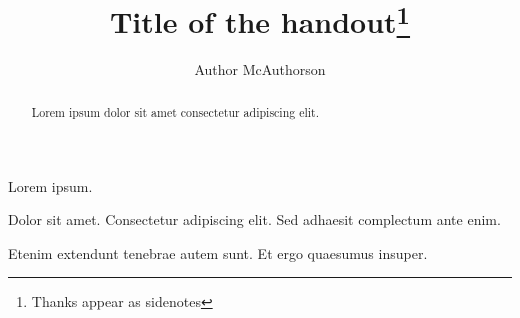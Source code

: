 \documentclass[nobib]{tufte-handout}
\title{Title of the handout\thanks{Thanks appear as sidenotes}}
\author[Author McAuthorson]{Author McAuthorson}
\begin{document}
\maketitle%

\begin{abstract}
\noindent
Lorem ipsum dolor sit amet consectetur adipiscing elit.
\end{abstract}

Lorem ipsum.

\vspace{1cm}

Dolor sit amet. Consectetur adipiscing elit. Sed adhaesit complectum ante enim. 

Etenim extendunt tenebrae autem sunt. Et ergo quaesumus insuper.

%
%
\end{document}
